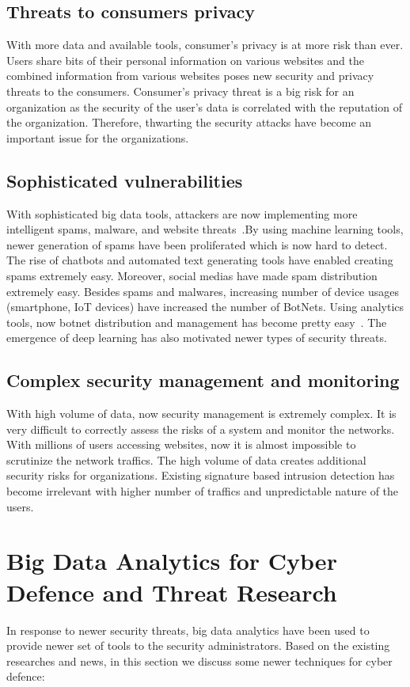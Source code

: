\documentclass[sigconf]{acmart}
\begin{document}
\subsection*{Threats to consumers privacy}
With more data and available tools, consumer's privacy is at more risk than ever. Users share bits of their personal information on various websites and the combined information from various websites poses new security and privacy threats to the consumers. Consumer's privacy threat is a big risk for an organization as the security of the user's data is correlated with the reputation of the organization. Therefore, thwarting the security attacks have become an important issue for the organizations.

\subsection*{Sophisticated vulnerabilities}
With sophisticated big data tools, attackers are now implementing more intelligent spams, malware, and website threats~\cite{Mahmood:2013}.By using machine learning tools, newer generation of spams have been proliferated which is now hard to detect. The rise of chatbots and automated text generating tools have enabled creating spams extremely easy. Moreover, social medias have made spam distribution extremely easy. Besides spams and malwares, increasing number of device usages (smartphone, IoT devices) have increased the number of BotNets. Using analytics tools, now botnet distribution and management has become pretty easy~\cite{Gahi:2016,SINGH:2014}. The emergence of deep learning has also motivated newer types of security threats. 

\subsection*{Complex security management and monitoring}
With high volume of data, now security management is extremely complex. It is very difficult to correctly assess the risks of a system and monitor the networks. With millions of users accessing websites, now it is almost impossible to scrutinize the network traffics. The high volume of data creates additional security risks for organizations. Existing signature based intrusion detection has become irrelevant with higher number of traffics and unpredictable nature of the users. 


\section*{Big Data Analytics for Cyber Defence and Threat Research}
In response to newer security threats, big data analytics have been used to provide newer set of tools to the security administrators. Based on the existing researches and news, in this section we discuss some newer techniques for cyber defence:
\end{document}
